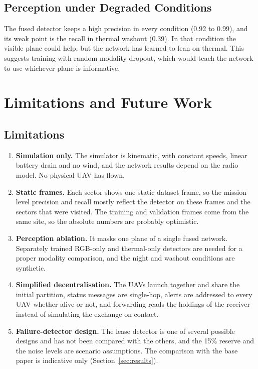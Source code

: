 \documentclass[10pt,letterpaper]{article}
\begin{document}
\subsection{Perception under Degraded Conditions}
The fused detector keeps a high precision in every condition (0.92 to 0.99), and its weak point is the recall in thermal washout (0.39). In that condition the visible plane could help, but the network has learned to lean on thermal. This suggests training with random modality dropout, which would teach the network to use whichever plane is informative.

\section{Limitations and Future Work}\label{sec:limits}
\subsection{Limitations}
\begin{enumerate}
\item \textbf{Simulation only.} The simulator is kinematic, with constant speeds, linear battery drain and no wind, and the network results depend on the radio model. No physical UAV has flown.
\item \textbf{Static frames.} Each sector shows one static dataset frame, so the mission-level precision and recall mostly reflect the detector on these frames and the sectors that were visited. The training and validation frames come from the same site, so the absolute numbers are probably optimistic.
\item \textbf{Perception ablation.} It masks one plane of a single fused network. Separately trained RGB-only and thermal-only detectors are needed for a proper modality comparison, and the night and washout conditions are synthetic.
\item \textbf{Simplified decentralisation.} The UAVs launch together and share the initial partition, status messages are single-hop, alerts are addressed to every UAV whether alive or not, and forwarding reads the holdings of the receiver instead of simulating the exchange on contact.
\item \textbf{Failure-detector design.} The lease detector is one of several possible designs and has not been compared with the others, and the 15\% reserve and the noise levels are scenario assumptions. The comparison with the base paper is indicative only (Section~\ref{sec:results}).
\end{enumerate}
\end{document}
